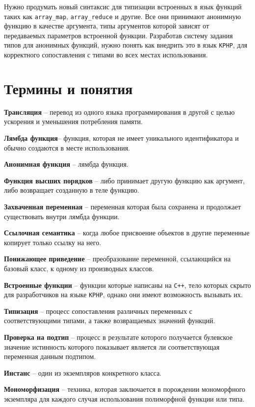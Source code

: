 Нужно продумать новый синтаксис для типизации встроенных в язык функций таких как \verb|array_map|, \verb|array_reduce| и другие. Все они принимают анонимную функцию в качестве аргумента, типы аргументов которой зависят от передаваемых параметров встроенной функции. Разработав систему задания типов для анонимных функций, нужно понять как внедрить это в язык \verb|KPHP|, для корректного сопоставления с типами во всех местах использования.

\section{Термины и понятия}
\textbf{Трансляция} -- перевод из одного языка программирования в другой с целью ускорения и уменьшения потребления памяти.

\textbf{Лямбда функция}-- функция, которая не имеет уникального идентификатора и обычно создаются в месте использования.

\textbf{Анонимная функция} -- лямбда функция.

\textbf{Функция высших порядков} -- либо принимает другую функцию как аргумент, либо возвращает созданную в теле функцию.

\textbf{Захваченная переменная} -- переменная которая была сохранена и продолжает существовать внутри лямбда функции.

\textbf{Ссылочная семантика} -- когда любое присвоение объектов в другие переменные копирует только ссылку на него.

\textbf{Понижающее приведение} -- преобразование переменной, ссылающийся на базовый класс, к одному из производных классов.

\textbf{Встроенные функции} -- функции которые написаны на \verb|C++|, тело которых скрыто для разработчиков на языке \verb|KPHP|, однако они имеют возможность вызывать их.

\textbf{Типизация} -- процесс сопоставления различных переменных с соответствующими типами, а также возвращаемых значений функций.

\textbf{Проверка на подтип} -- процесс в результате которого получается булевское значение истинность которого показывает является ли соответствующая переменная данным подтипом.

\textbf{Инстанс} -- один из экземпляров конкретного класса.

\textbf{Мономорфизация} -- техника, которая заключается в порождении мономорфного экземпляра для каждого случая использования полиморфной функции или типа.

